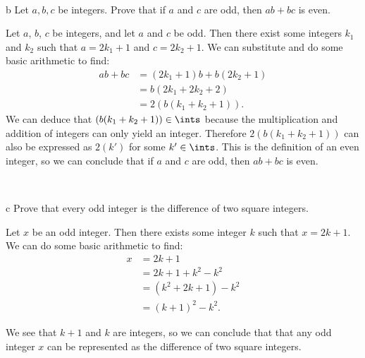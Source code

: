 \documentclass{article}
\begin{document}
\

\begin{problem} b
Let $a, b, c$ be integers. Prove that if $a$ and $c$ are odd, then $ab + bc$ is even.
\end{problem}

Let $a$, $b$, $c$ be integers, and let $a$ and $c$ be odd. Then there exist some integers $k_1$ and $k_2$ such that $a=2k_1+1$ and $c=2k_2+1$.
We can substitute and do some basic arithmetic to find:
\begin{align*}
    ab+bc &= (2k_1+1)b+b(2k_2+1) \\
    &= b(2k_1+2k_2+2) \\
    &= 2(b(k_1+k_2+1)).
\end{align*}
We can deduce that $(b(k_1+k_2+1)) \in \ints$ because the multiplication and addition of integers can only yield an integer. Therefore $2(b(k_1+k_2+1))$ can also be expressed as $2(k')$ for some $k' \in \ints$. This is the definition of an even integer, so we can  conclude that if $a$ and $c$ are odd, then $ab+bc$ is even.

\

\begin{problem} c
Prove that every odd integer is the difference of two square integers.
\end{problem}

Let $x$ be an odd integer. Then there exists some integer $k$ such that $x=2k+1$.
We can do some basic arithmetic to find:
\begin{align*}
    x &= 2k+1 \\
    &= 2k + 1 + k^2 - k^2 \\
    &= (k^2 + 2k + 1 ) - k^2 \\
    &= (k+1)^2 - k^2.
\end{align*}

We see that $k+1$ and $k$ are integers, so we can conclude that that any odd integer $x$ can be represented as the difference of two square integers.

\
\hline
\section{}
\end{document}
